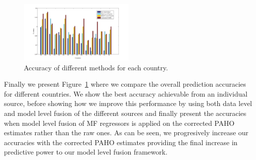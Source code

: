 \begin{figure}[h]
\centering
\includegraphics[width=0.5\textwidth]{fig/accs}
\caption{Accuracy of different methods for each country.}
\label{fig:accuracies}
\end{figure}

Finally we present Figure~\ref{fig:accuracies} where we compare
the overall prediction accuracies for different countries. We show the best
accuracy achievable from an individual source, before showing how we improve this 
performance by using both data level and model level fusion of the different sources and finally 
present the accuracies when model level fusion of MF regressors is applied on the corrected PAHO 
estimates rather than the raw ones. As can be seen, we progresively increase our accuracies
with the corrected PAHO estimates providing the final increase in predictive power to 
our model level fusion framework.

